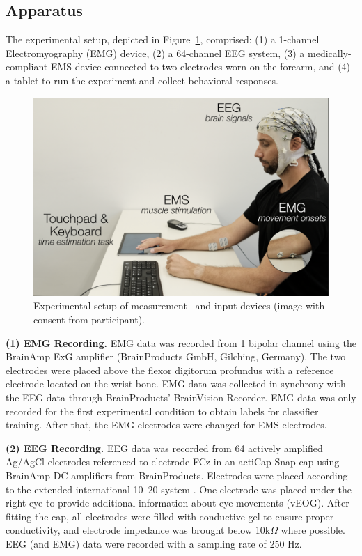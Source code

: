\subsection{Apparatus}
The experimental setup, depicted in Figure~\ref{fig:setup}, comprised: (1) a 1-channel Electromyography (EMG) device, (2) a 64-channel EEG system, (3) a medically-compliant EMS device connected to two electrodes worn on the forearm, and (4) a tablet to run the experiment and collect behavioral responses.

\begin{figure}[!h]
    \centering
    \includegraphics[width=\columnwidth]{figures/setup_fixed.png}
    \caption{Experimental setup of measurement-- and input devices (image with consent from participant).}
    \label{fig:setup}
\end{figure}

\indent\textbf{(1) EMG Recording.} EMG data was recorded from 1 bipolar channel using the BrainAmp ExG amplifier (BrainProducts GmbH, Gilching, Germany). The two electrodes were placed above the flexor digitorum profundus with a reference electrode located on the wrist bone. EMG data was collected in synchrony with the EEG data through BrainProducts' BrainVision Recorder. EMG data was only recorded for the first experimental condition to obtain labels for classifier training. After that, the EMG electrodes were changed for EMS electrodes.

\indent\textbf{(2) EEG Recording.} EEG data was recorded from 64 actively amplified Ag/AgCl electrodes referenced to electrode FCz in an actiCap Snap cap using BrainAmp DC amplifiers from BrainProducts. Electrodes were placed according to the extended international 10–20 system \cite{Jasper1983-uw}. One electrode was placed under the right eye to provide additional information about eye movements (vEOG). After fitting the cap, all electrodes were filled with conductive gel to ensure proper conductivity, and electrode impedance was brought below 10k$\Omega$ where possible. EEG (and EMG) data were recorded with a sampling rate of 250 Hz. 

